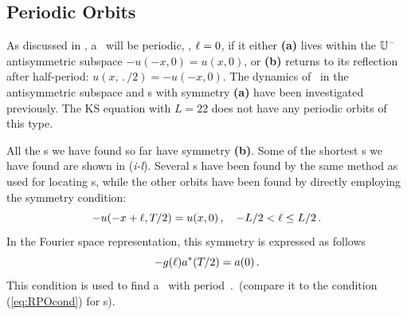 \subsection{Periodic Orbits} \label{ssec:po}
As discussed in , a \rpo\ will be periodic, \ie,
$\ell = 0$, if it either {\bf (a)} lives within the
 $\mathbb{U}^-$ antisymmetric
subspace $-u(-x,0) = u(x,0)$, or {\bf (b)} returns to its reflection
after half-period: $u(x,\period{}/2)=-u(-x,0)$.  The dynamics of
\KSe\ in the antisymmetric subspace and \po s with symmetry {\bf (a)} have
been investigated
previously. The KS equation
with $L = 22$ does not have any periodic orbits of this type.


All the \po s we have found so far have symmetry {\bf (b)}.
Some of the shortest \po s we have found are shown in
(\textit{i-l}).  Several \po s have been found by the same
method as used for locating \rpo s, while the other orbits have been
found by directly employing the symmetry condition:
\[ -u(-x+\ell,{T_{}}/2) = u(x,0)\,, \quad -L/2 < \ell \leq L/2\,.\]
In the Fourier space representation, this symmetry is expressed as
follows
\[ -g(\ell)a^\ast({T_{}}/2) = a(0)\,. \]
This condition is used to find a \po\ with period $\period{}$
(compare it to the condition (\ref{eq:RPOcond}) for \rpo s).


